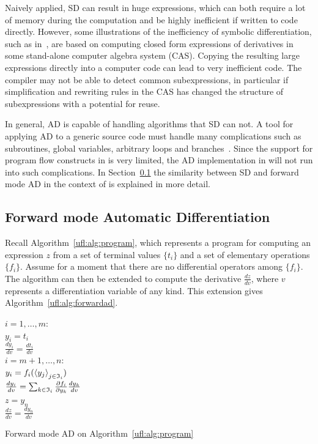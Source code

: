 Naively applied, SD can result in huge expressions, which can both
require a lot of memory during the computation and be highly
inefficient if written to code directly. However, some illustrations
of the inefficiency of symbolic differentiation, such as
in~\cite{Gri1989}, are based on computing closed form expressions of
derivatives in some stand-alone computer algebra system (CAS).
Copying the resulting large expressions directly into a computer code
can lead to very inefficient code. The compiler may not be able to
detect common subexpressions, in particular if simplification and
rewriting rules in the CAS has changed the structure of subexpressions
with a potential for reuse.

In general, AD is capable of handling algorithms that SD can not.  A
tool for applying AD to a generic source code must handle many
complications such as subroutines, global variables, arbitrary loops
and branches~\cite{BisCar1992,BisHov2002,GieKam1998}.  Since the
support for program flow constructs in \ufl{} is very limited, the AD
implementation in \ufl{} will not run into such complications.  In
Section~\ref{ufl:sec:forwardad} the similarity between SD and forward
mode AD in the context of \ufl{} is explained in more detail.

\subsection{Forward mode Automatic Differentiation}
\label{ufl:sec:forwardad}

Recall Algorithm~\ref{ufl:alg:program}, which represents a program for
computing an expression $z$ from a set of terminal values $\{ t_i \}$
and a set of elementary operations $\{ f_i \}$. Assume for a moment
that there are no differential operators among $\{ f_i \}$.  The
algorithm can then be extended to compute the derivative $\frac{d z}{d
v}$, where $v$ represents a differentiation variable of any kind.
This extension gives Algorithm~\ref{ufl:alg:forwardad}.

\begin{algorithm}
\afor $i = 1, \ldots, m$:\\
\tab $y_i = t_i$ \\
\tab $\frac{d y_i}{d v} = \frac{d t_i}{d v}$ \\
\afor $i = m+1, \ldots, n$:\\
\tab $y_i = f_i(\left\langle{y_j}\right\rangle_{j\in\mathfrak{I}_i})$ \\
\tab $\frac{d y_i}{d v} = \sum_{k\in\mathfrak{I}_i} \frac{\partial f_i}{\partial y_k} \frac{d y_k}{d v}$ \\
$z = y_n$ \\
$\frac{d z}{d v} = \frac{d y_n}{d v}$
\caption{Forward mode AD on Algorithm~\ref{ufl:alg:program}}
\label{ufl:alg:forwardad}
\end{algorithm}

